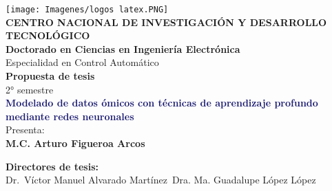 \begin{titlepage}
    \begin{center}
        \noindent \texttt{[image: Imagenes/logos latex.PNG]} \\[2cm] %
        \textbf{{\Huge CENTRO NACIONAL DE INVESTIGACIÓN Y DESARROLLO TECNOLÓGICO}}\\[1cm]
        
        \textbf{\Large{Doctorado en Ciencias en Ingeniería Electrónica}}\\
        {\large Especialidad en Control Automático}\\[1cm]
        
        \textbf{{\Large Propuesta de tesis}}\\
        {\large 2° semestre}\\[1cm]
              
        \textbf{\Large{\textcolor{MidnightBlue}{Modelado de datos ómicos con técnicas de aprendizaje profundo mediante redes neuronales}}}\\[1cm]
        
        {\large Presenta:}\\
        \textbf{{\Large M.C. Arturo Figueroa Arcos}}\\[1cm]
    
    \end{center}
    \begin{minipage}{0.46\textwidth}								
        \begin{flushleft}
        \begin{center}
    
            \textbf{Directores de tesis:}\\
        
            Dr.\ Víctor Manuel Alvarado Martínez\
            Dra. Ma. Guadalupe López López\\
            
    \end{center}
    \end{flushleft}
    \end{minipage}		
    \begin{minipage}{0.52\textwidth}		
    \vspace{0cm}
    \begin{flushright}															%
    \begin{center}
    

\end{center}
\end{flushright}
\end{minipage}
\end{titlepage}
